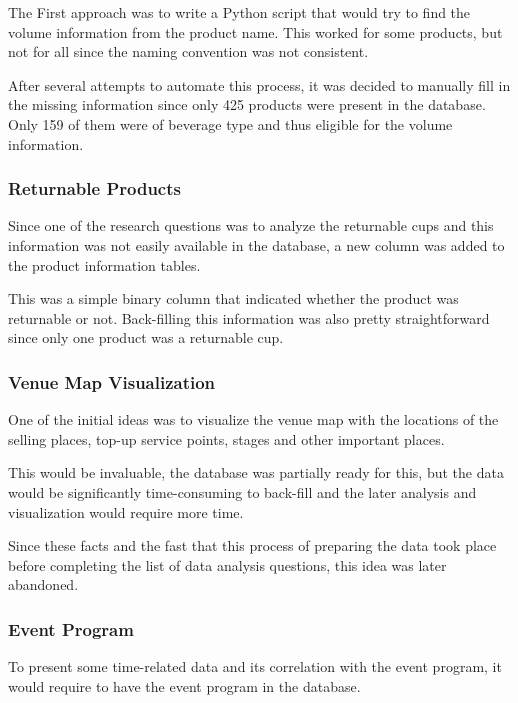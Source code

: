 The First approach was to write a Python script that would try to find the volume information from the product name.
This worked for some products, but not for all since the naming convention was not consistent.

After several attempts to automate this process, it was decided to manually fill in the missing information since only 425 products were present in the database.
Only 159 of them were of beverage type and thus eligible for the volume information.

\subsubsection{Returnable Products}
\label{subsubsec:data-methodology-local-database-modifications-returnable}
Since one of the research questions was to analyze the returnable cups and this information was not easily available in the database, a new column was added to the product information tables.

This was a simple binary column that indicated whether the product was returnable or not.
Back-filling this information was also pretty straightforward since only one product was a returnable cup.

\subsubsection{Venue Map Visualization}
\label{subsubsec:data-methodology-local-database-modifications-venue-map}
One of the initial ideas was to visualize the venue map with the locations of the selling places, top-up service points, stages and other important places.

This would be invaluable, the database was partially ready for this, but the data would be significantly time-consuming to back-fill and the later analysis and visualization would require more time.

Since these facts and the fast that this process of preparing the data took place before completing the list of data analysis questions, this idea was later abandoned.

\subsubsection{Event Program}
\label{subsubsec:data-methodology-local-database-modifications-program}
To present some time-related data and its correlation with the event program, it would require to have the event program in the database.

